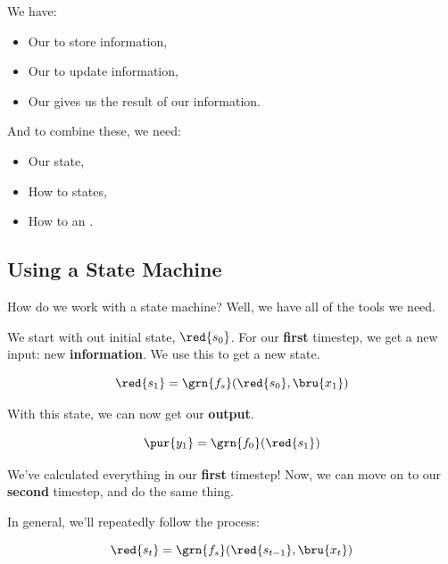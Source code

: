         We have:
        
        \begin{itemize}
            \item Our  to store information,
            \item Our  to update information,
            \item Our  gives us the result of our information.
        \end{itemize}
        
        And to combine these, we need:
        
        \begin{itemize}
            \item Our  state,
            \item How to  states,
            \item How to  an .
        \end{itemize}

    \subsection{Using a State Machine}

        How do we work with a state machine? Well, we have all of the tools we need.
        
        We start with out initial state, $\red{s_0}$. For our \textbf{first} timestep, we get a new input: new \textbf{information}. We use this to get a new state.
        
        \begin{equation}
            \red{s_1} = 
            \grn{f_s}(\red{s_0}, \bru{x_1})
        \end{equation}
        
        With this state, we can now get our \textbf{output}.
        
        \begin{equation}
            \pur{y_1} = 
            \grn{f_0}(\red{s_1})
        \end{equation}
        
        We've calculated everything in our \textbf{first} timestep! Now, we can move on to our \textbf{second} timestep, and do the same thing.
        
        In general, we'll repeatedly follow the process:
        
        \begin{equation}
            \red{s_t} = 
            \grn{f_s}(\red{s_{t-1}}, \bru{x_t})
        \end{equation}
        
